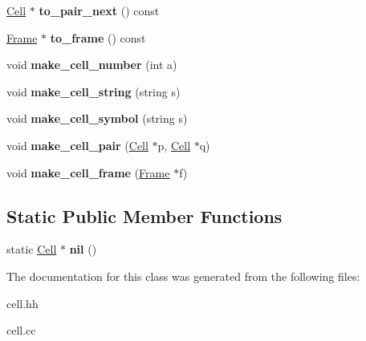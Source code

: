\begin{DoxyCompactItemize}
\item 
\hypertarget{classCell_ae4b69fad453eabfef135575dfff784dc}{\hyperlink{classCell}{Cell} $\ast$ {\bfseries to\-\_\-pair\-\_\-next} () const }\label{classCell_ae4b69fad453eabfef135575dfff784dc}

\item 
\hypertarget{classCell_a5d07f221a15e84b35abe57071ea46cab}{\hyperlink{classFrame}{Frame} $\ast$ {\bfseries to\-\_\-frame} () const }\label{classCell_a5d07f221a15e84b35abe57071ea46cab}

\item 
\hypertarget{classCell_abb258fb7c184260fef5961f814bceb7f}{void {\bfseries make\-\_\-cell\-\_\-number} (int a)}\label{classCell_abb258fb7c184260fef5961f814bceb7f}

\item 
\hypertarget{classCell_ab0e4f4d88666cadc7d21a0cd3971efee}{void {\bfseries make\-\_\-cell\-\_\-string} (string s)}\label{classCell_ab0e4f4d88666cadc7d21a0cd3971efee}

\item 
\hypertarget{classCell_a56f50d1f105b2e8f087870f27d80e693}{void {\bfseries make\-\_\-cell\-\_\-symbol} (string s)}\label{classCell_a56f50d1f105b2e8f087870f27d80e693}

\item 
\hypertarget{classCell_a3ed1852893b5cdd81faa73e832451adf}{void {\bfseries make\-\_\-cell\-\_\-pair} (\hyperlink{classCell}{Cell} $\ast$p, \hyperlink{classCell}{Cell} $\ast$q)}\label{classCell_a3ed1852893b5cdd81faa73e832451adf}

\item 
\hypertarget{classCell_a437be131a0192328669af7539be7acb7}{void {\bfseries make\-\_\-cell\-\_\-frame} (\hyperlink{classFrame}{Frame} $\ast$f)}\label{classCell_a437be131a0192328669af7539be7acb7}

\end{DoxyCompactItemize}
\subsection*{Static Public Member Functions}
\begin{DoxyCompactItemize}
\item 
\hypertarget{classCell_aaddcdd9cbc00527042f0a67b07cf20e1}{static \hyperlink{classCell}{Cell} $\ast$ {\bfseries nil} ()}\label{classCell_aaddcdd9cbc00527042f0a67b07cf20e1}

\end{DoxyCompactItemize}


The documentation for this class was generated from the following files\-:\begin{DoxyCompactItemize}
\item 
cell.\-hh\item 
cell.\-cc\end{DoxyCompactItemize}
